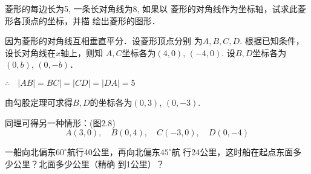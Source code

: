 \begin{example}
    菱形的每边长为5, 一条长对角线为8, 如果以
    菱形的对角线作为坐标轴，试求此菱形各顶点的坐标，并描
    绘出菱形的图形．
\end{example}

\begin{solution}
    因为菱形的对角线互相垂直平分．设菱形顶点分别
为$A,B,C,D$. 根据已知条件，设长对角线在$x$轴上，则知
$A,C$坐标各为$(4,0)$, $(-4,0)$. 设$B,D$坐标各为$(0,b)$,
$(0,-b)$．

$\therefore\quad |AB|=BC|=|CD|=|DA|=5$

由勾股定理可求得$B,D$的坐标各为$(0,3)$, $(0,-3)$.

同理可得另一种情形：(图2.8)
\[A(3,0),\quad B(0,4),\quad C(-3,0),\quad D(0,-4)\]
\begin{figure}[htp]
    \centering
    \caption{}
\end{figure}

\end{solution}

\begin{example}
  一船向北偏东$60^{\circ}$航行40公里，再向北偏东$45^{\circ}$航
行24公里，这时船在起点东面多少公里？北面多少公里（精确
到1公里）？  
\end{example}

